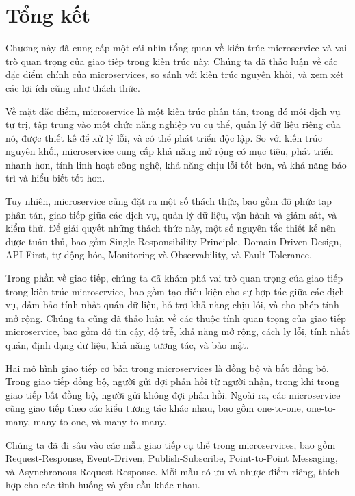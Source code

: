 \section{Tổng kết}

Chương này đã cung cấp một cái nhìn tổng quan về kiến trúc microservice và vai trò quan trọng của giao tiếp trong kiến trúc này. Chúng ta đã thảo luận về các đặc điểm chính của microservices, so sánh với kiến trúc nguyên khối, và xem xét các lợi ích cũng như thách thức.

Về mặt đặc điểm, microservice là một kiến trúc phân tán, trong đó mỗi dịch vụ tự trị, tập trung vào một chức năng nghiệp vụ cụ thể, quản lý dữ liệu riêng của nó, được thiết kế để xử lý lỗi, và có thể phát triển độc lập. So với kiến trúc nguyên khối, microservice cung cấp khả năng mở rộng có mục tiêu, phát triển nhanh hơn, tính linh hoạt công nghệ, khả năng chịu lỗi tốt hơn, và khả năng bảo trì và hiểu biết tốt hơn.

Tuy nhiên, microservice cũng đặt ra một số thách thức, bao gồm độ phức tạp phân tán, giao tiếp giữa các dịch vụ, quản lý dữ liệu, vận hành và giám sát, và kiểm thử. Để giải quyết những thách thức này, một số nguyên tắc thiết kế nên được tuân thủ, bao gồm Single Responsibility Principle, Domain-Driven Design, API First, tự động hóa, Monitoring và Observability, và Fault Tolerance.

Trong phần về giao tiếp, chúng ta đã khám phá vai trò quan trọng của giao tiếp trong kiến trúc microservice, bao gồm tạo điều kiện cho sự hợp tác giữa các dịch vụ, đảm bảo tính nhất quán dữ liệu, hỗ trợ khả năng chịu lỗi, và cho phép tính mở rộng. Chúng ta cũng đã thảo luận về các thuộc tính quan trọng của giao tiếp microservice, bao gồm độ tin cậy, độ trễ, khả năng mở rộng, cách ly lỗi, tính nhất quán, định dạng dữ liệu, khả năng tương tác, và bảo mật.

Hai mô hình giao tiếp cơ bản trong microservices là đồng bộ và bất đồng bộ. Trong giao tiếp đồng bộ, người gửi đợi phản hồi từ người nhận, trong khi trong giao tiếp bất đồng bộ, người gửi không đợi phản hồi. Ngoài ra, các microservice cũng giao tiếp theo các kiểu tương tác khác nhau, bao gồm one-to-one, one-to-many, many-to-one, và many-to-many.

Chúng ta đã đi sâu vào các mẫu giao tiếp cụ thể trong microservices, bao gồm Request-Response, Event-Driven, Publish-Subscribe, Point-to-Point Messaging, và Asynchronous Request-Response. Mỗi mẫu có ưu và nhược điểm riêng, thích hợp cho các tình huống và yêu cầu khác nhau.

